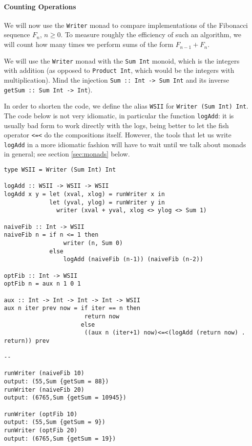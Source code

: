 \documentclass[11pt]{article}
\theoremstyle{nonumberplain}
\newcommand*\lsin{\lstinline}
\begin{document}
\paragraph{Counting Operations}
We will now use the \lsin|Writer| monad to compare implementations of the Fibonacci sequence $F_n$, $n \geq 0$. To measure roughly the efficiency of such an algorithm, we will count how many times we perform sums of the form $F_{n-1} + F_n$.

We will use the \lsin|Writer| monad with the \lsin|Sum Int| monoid, which is the integers with addition (as opposed to \lsin|Product Int|, which would be the integers with multiplication). Mind the injection \lsin|Sum :: Int -> Sum Int| and its inverse \lsin|getSum :: Sum Int -> Int|).

In order to shorten the code, we define the alias \lsin|WSII| for \lsin|Writer (Sum Int) Int|. The code below is not very idiomatic, in particular the function \lsin|logAdd|: it is usually bad form to work directly with the logs, being better to let the fish operator \lsin|<=<| do the compositions itself. However, the tools that let us write \lsin|logAdd| in a more idiomatic fashion will have to wait until we talk about monads in general; see section \ref{sec:monads} below.

\begin{lstlisting}
type WSII = Writer (Sum Int) Int

logAdd :: WSII -> WSII -> WSII
logAdd x y = let (xval, xlog) = runWriter x in
             let (yval, ylog) = runWriter y in
               writer (xval + yval, xlog <> ylog <> Sum 1)

naiveFib :: Int -> WSII
naiveFib n = if n <= 1 then
                 writer (n, Sum 0)
             else
                 logAdd (naiveFib (n-1)) (naiveFib (n-2))

optFib :: Int -> WSII
optFib n = aux n 1 0 1

aux :: Int -> Int -> Int -> Int -> WSII
aux n iter prev now = if iter == n then
                       return now
                      else
                       ((aux n (iter+1) now)<=<(logAdd (return now) . return)) prev
                        
--

runWriter (naiveFib 10)
output: (55,Sum {getSum = 88})
runWriter (naiveFib 20)
output: (6765,Sum {getSum = 10945})

runWriter (optFib 10)
output: (55,Sum {getSum = 9})
runWriter (optFib 20)
output: (6765,Sum {getSum = 19})
\end{lstlisting}
\end{document}
